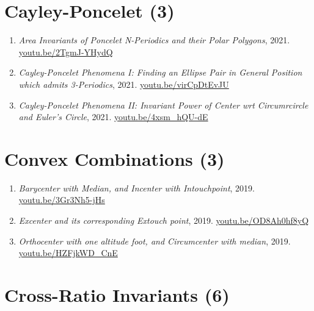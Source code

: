 \documentclass[12pt]{article}
\begin{document}
\section{Cayley-Poncelet (3)}

\begin{enumerate}[resume]
\item \textit{Area Invariants of Poncelet N-Periodics and their Polar Polygons}, 2021. \href{https://youtu.be/2TgmJ-YHydQ}{\url{youtu.be/2TgmJ-YHydQ}}
\item \textit{Cayley-Poncelet Phenomena I: Finding an Ellipse Pair in General Position which admits 3-Periodics}, 2021. \href{https://youtu.be/virCpDtEvJU}{\url{youtu.be/virCpDtEvJU}}
\item \textit{Cayley-Poncelet Phenomena II: Invariant Power of Center wrt Circumrcircle and Euler's Circle}, 2021. \href{https://youtu.be/4xsm_hQU-dE}{\url{youtu.be/4xsm\_hQU-dE}}
\end{enumerate}

\section{Convex Combinations (3)}

\begin{enumerate}[resume]
\item \textit{Barycenter with Median, and Incenter with Intouchpoint}, 2019. \href{https://youtu.be/3Gr3Nh5-jHs}{\url{youtu.be/3Gr3Nh5-jHs}}
\item \textit{Excenter and its corresponding Extouch point}, 2019. \href{https://youtu.be/OD8Ah0hf8yQ}{\url{youtu.be/OD8Ah0hf8yQ}}
\item \textit{Orthocenter with one altitude foot, and Circumcenter with median}, 2019. \href{https://youtu.be/HZFjkWD_CnE}{\url{youtu.be/HZFjkWD\_CnE}}
\end{enumerate}

\section{Cross-Ratio Invariants (6)}
\end{document}
